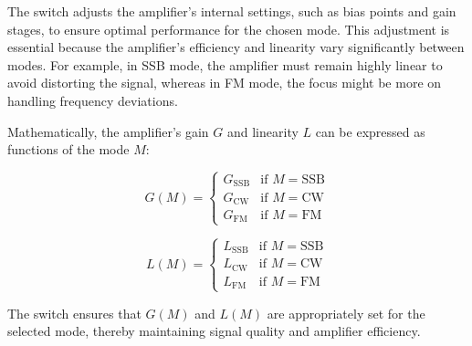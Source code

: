 The switch adjusts the amplifier's internal settings, such as bias points and gain stages, to ensure optimal performance for the chosen mode. This adjustment is essential because the amplifier's efficiency and linearity vary significantly between modes. For example, in SSB mode, the amplifier must remain highly linear to avoid distorting the signal, whereas in FM mode, the focus might be more on handling frequency deviations.

Mathematically, the amplifier's gain \( G \) and linearity \( L \) can be expressed as functions of the mode \( M \):

\[
G(M) = \begin{cases}
G_{\text{SSB}} & \text{if } M = \text{SSB} \\
G_{\text{CW}} & \text{if } M = \text{CW} \\
G_{\text{FM}} & \text{if } M = \text{FM}
\end{cases}
\]

\[
L(M) = \begin{cases}
L_{\text{SSB}} & \text{if } M = \text{SSB} \\
L_{\text{CW}} & \text{if } M = \text{CW} \\
L_{\text{FM}} & \text{if } M = \text{FM}
\end{cases}
\]

The switch ensures that \( G(M) \) and \( L(M) \) are appropriately set for the selected mode, thereby maintaining signal quality and amplifier efficiency.

